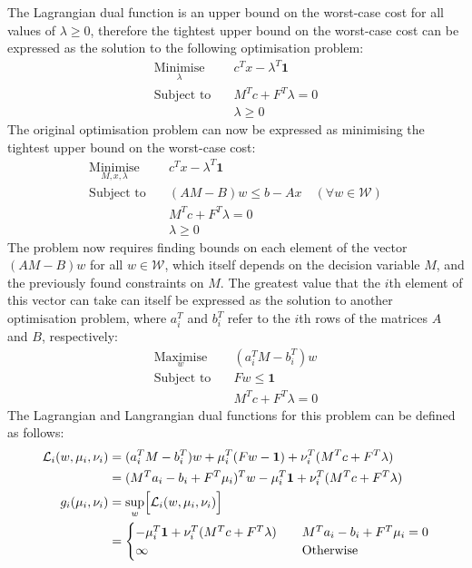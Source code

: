 The Lagrangian dual function is an upper bound on the worst-case cost for all values of $\lambda \ge 0$, therefore the tightest upper bound on the worst-case cost can be expressed as the solution to the following optimisation problem:
\begin{align*}
    \underset{\lambda}{\text{Minimise}} \quad & c^Tx - \lambda^T\mathbf{1} \\
    \text{Subject to} \quad & M^Tc + F^T\lambda = 0 \\
    & \lambda \ge 0
\end{align*}
The original optimisation problem can now be expressed as minimising the tightest upper bound on the worst-case cost:
\begin{align*}
    \underset{M, x, \lambda}{\text{Minimise}} \quad & c^Tx - \lambda^T\mathbf{1} \\
    \text{Subject to} \quad & (AM - B)w \le b - Ax \quad (\forall w\in\mathcal{W}) \\
    & M^Tc + F^T\lambda = 0 \\
    & \lambda \ge 0
\end{align*}
The problem now requires finding bounds on each element of the vector $(AM - B)w$ for all $w\in\mathcal{W}$, which itself depends on the decision variable $M$, and the previously found constraints on $M$. The greatest value that the $i$th element of this vector can take can itself be expressed as the solution to another optimisation problem, where $a_i^T$ and $b_i^T$ refer to the $i$th rows of the matrices $A$ and $B$, respectively:
\begin{align*}
    \underset{w}{\text{Maximise}} \quad & (a_i^TM - b_i^T)w \\
    \text{Subject to} \quad & Fw \le \mathbf{1} \\
    & M^Tc + F^T\lambda = 0
\end{align*}
The Lagrangian and Langrangian dual functions for this problem can be defined as follows:
\begin{align*}
    \mathcal{L}_i(w, \mu_i, \nu_i) &= (a_i^TM - b_i^T)w + \mu_i^T(Fw - \mathbf{1}) + \nu_i^T(M^Tc + F^T\lambda) \\
    &= (M^Ta_i - b_i + F^T\mu_i)^Tw - \mu_i^T \mathbf{1} + \nu_i^T(M^Tc + F^T\lambda) \\
    g_i(\mu_i, \nu_i) &= \underset{w}{\sup}\Bigl[ \mathcal{L}_i(w, \mu_i, \nu_i) \Bigr] \\
    &= \begin{cases}
        -\mu_i^T \mathbf{1} + \nu_i^T(M^Tc + F^T\lambda) \quad & M^Ta_i - b_i + F^T\mu_i = 0 \\
        \infty & \text{Otherwise}
    \end{cases}
\end{align*}
